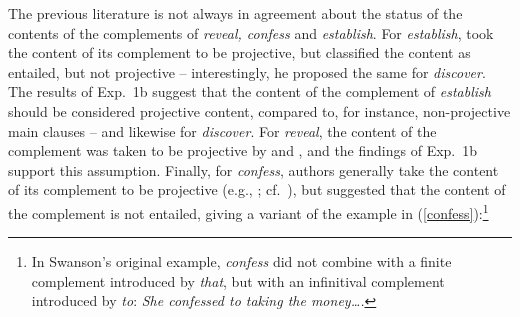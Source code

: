 \documentclass[11pt,fleqn]{article}
\newcommand{\6}{\mbox{$[\hspace*{-.6mm}[$}}
\newcommand{\9}{\mbox{$]\hspace*{-.6mm}]$}}
\begin{document}
The previous literature is not always in agreement about the status of the contents of the complements of {\em reveal, confess} and {\em establish}. For {\em establish}, \citet{wyse} took the content of its complement to be projective, but \citet{swanson2012} classified the content as entailed, but not projective -- interestingly, he proposed the same for {\em discover}. The results of Exp.~1b suggest that the content of the complement of {\em establish} should be considered projective content, compared to, for instance, non-projective main clauses -- and likewise for {\em discover}. For {\em reveal}, the content of the complement was taken to be projective by \citet{hooper1974} and \citet{melvold1991}, and the findings of Exp.~1b support this assumption. Finally, for {\em confess}, authors generally take the content of its complement to be projective (e.g., \citealt{reis1973,melvold1991,schultz2003,swanson2012,karttunen2016}; cf.\ \citealt{wyse}), but \citet{swanson2012} suggested that the content of the complement is not entailed, giving a variant of the example in (\ref{confess}):\footnote{In Swanson's original example, {\em confess} did not combine with a finite complement introduced by {\em that}, but with an infinitival complement introduced by {\em to}: {\em She confessed to taking the money\ldots.}}
\end{document}
